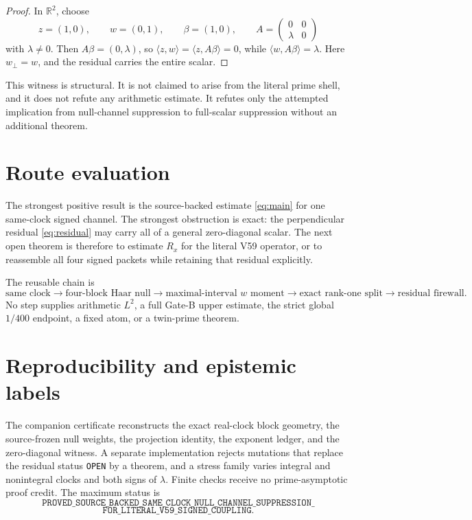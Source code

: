 \documentclass[10pt]{article}
\newcommand{\ip}[2]{\langle #1,#2\rangle}
\begin{document}
\begin{proof}
In \(\mathbb R^2\), choose
\[
 z=(1,0),\qquad w=(0,1),\qquad \beta=(1,0),\qquad
 A=\begin{pmatrix}0&0\\ \lambda&0\end{pmatrix}
\]
with \(\lambda\ne0\).  Then \(A\beta=(0,\lambda)\), so
\(\ip{z}{w}=\ip{z}{A\beta}=0\), while
\(\ip{w}{A\beta}=\lambda\).  Here \(w_\perp=w\), and the residual carries
the entire scalar.
\end{proof}

This witness is structural.  It is not claimed to arise from the literal
prime shell, and it does not refute any arithmetic estimate.  It refutes only
the attempted implication from null-channel suppression to full-scalar
suppression without an additional theorem.

\section{Route evaluation}

The strongest positive result is the source-backed estimate
\eqref{eq:main} for one same-clock signed channel.  The strongest obstruction
is exact: the perpendicular residual \eqref{eq:residual} may carry all of a
general zero-diagonal scalar.  The next open theorem is therefore to estimate
\(R_x\) for the literal V59 operator, or to reassemble all four signed
packets while retaining that residual explicitly.

The reusable chain is
\[
 \text{same clock}\to\text{four-block Haar null}
 \to\text{maximal-interval }w\text{ moment}
 \to\text{exact rank-one split}
 \to\text{residual firewall}.
\]
No step supplies arithmetic \(L^2\), a full Gate-B upper estimate, the
strict global \(1/400\) endpoint, a fixed atom, or a twin-prime theorem.

\section*{Reproducibility and epistemic labels}

The companion certificate reconstructs the exact real-clock block geometry,
the source-frozen null weights, the projection identity, the exponent ledger,
and the zero-diagonal witness.  A separate implementation rejects mutations
that replace the residual status \texttt{OPEN} by a theorem, and a stress
family varies integral and nonintegral clocks and both signs of \(\lambda\).
Finite checks receive no prime-asymptotic proof credit.  The maximum status is
\[
\texttt{PROVED\_SOURCE\_BACKED\_SAME\_CLOCK\_NULL\_CHANNEL\_SUPPRESSION\_}
\]
\[
\texttt{FOR\_LITERAL\_V59\_SIGNED\_COUPLING}.
\]



\end{document}
